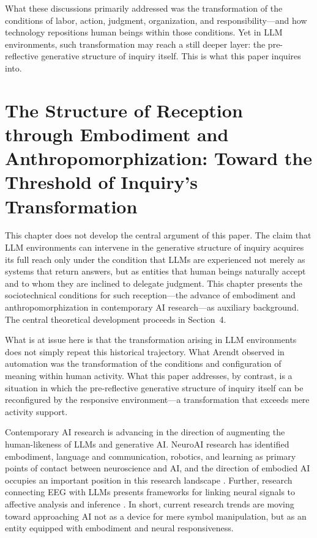 \documentclass[12pt]{article}
\begin{document}
What these discussions primarily addressed was the transformation of the conditions of labor, action, judgment, organization, and responsibility---and how technology repositions human beings within those conditions. Yet in LLM environments, such transformation may reach a still deeper layer: the pre-reflective generative structure of inquiry itself. This is what this paper inquires into.

\section{The Structure of Reception through Embodiment and Anthropomorphization: Toward the Threshold of Inquiry's Transformation}

This chapter does not develop the central argument of this paper. The claim that LLM environments can intervene in the generative structure of inquiry acquires its full reach only under the condition that LLMs are experienced not merely as systems that return answers, but as entities that human beings naturally accept and to whom they are inclined to delegate judgment. This chapter presents the sociotechnical conditions for such reception---the advance of embodiment and anthropomorphization in contemporary AI research---as auxiliary background. The central theoretical development proceeds in Section~4.

What is at issue here is that the transformation arising in LLM environments does not simply repeat this historical trajectory. What Arendt observed in automation was the transformation of the conditions and configuration of meaning within human activity. What this paper addresses, by contrast, is a situation in which the pre-reflective generative structure of inquiry itself can be reconfigured by the responsive environment---a transformation that exceeds mere activity support.

Contemporary AI research is advancing in the direction of augmenting the human-likeness of LLMs and generative AI. NeuroAI research has identified embodiment, language and communication, robotics, and learning as primary points of contact between neuroscience and AI, and the direction of embodied AI occupies an important position in this research landscape \citep{fellous2026,nihbrain2024}. Further, research connecting EEG with LLMs presents frameworks for linking neural signals to affective analysis and inference \citep{neuroai2024}. In short, current research trends are moving toward approaching AI not as a device for mere symbol manipulation, but as an entity equipped with embodiment and neural responsiveness.
\end{document}
